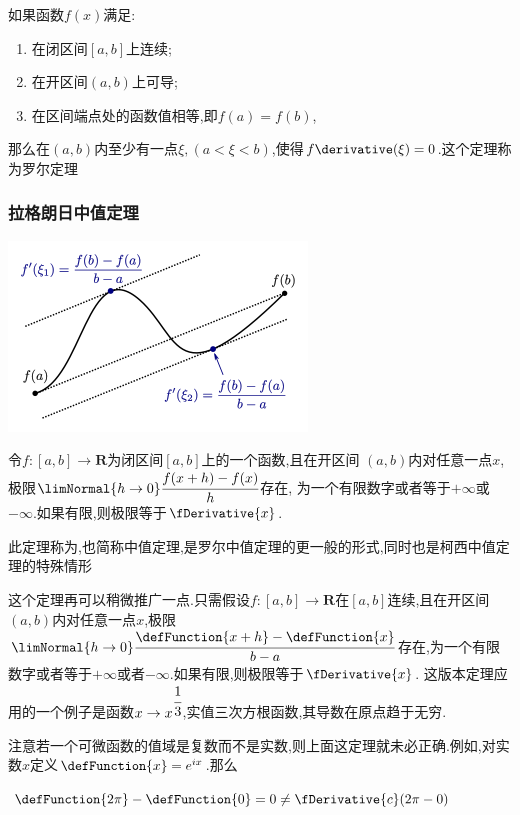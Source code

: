 {{{{  如果函数$f(x)$满足:

  \begin{enumerate}
    \item 在闭区间$[a,b]$上连续;
    \item 在开区间$(a,b)$上可导;
    \item 在区间端点处的函数值相等,即$f(a) = f(b)$,
  \end{enumerate}

  那么在$(a,b)$内至少有一点$\xi, (a<\xi<b)$,使得$f\derivative(\xi) = 0$.这个定理称为罗尔定理
}%

\subsubsection{拉格朗日中值定理}{
\begin{center}
  \includegraphics{resources/Lagrange's_mean_value_theorem.png}
\end{center}

令$f : [a,b] \to \mathbf{R}$为闭区间$[a,b]$上的一个函数,且在开区间
$(a,b)$内对任意一点$x$,极限$\limNormal{h \to 0}\cfrac{f(x + h) - f(x)}{h}$存在,
为一个有限数字或者等于$+\infty$或$-\infty$.如果有限,则极限等于$\fDerivative{x}$.

此定理称为{},也简称中值定理,是罗尔中值定理的更一般的形式,同时也是柯西中值定理的特殊情形

这个定理再可以稍微推广一点.只需假设$f : [a,b] \to \mathbf{R}$在$[a,b]$连续,且在开区间$(a,b)$内对任意一点$x$,极限$\limNormal{h \to 0}
  \cfrac{\defFunction{x + h} - \defFunction{x}}{b - a}$存在,为一个有限数字或者等于$+\infty$或者$-\infty$.如果有限,则极限等于$\fDerivative{x}$.
这版本定理应用的一个例子是函数$x \to x^{\cfrac{1}{3}}$,实值三次方根函数,其导数在原点趋于无穷.

注意若一个可微函数的值域是复数而不是实数,则上面这定理就未必正确.例如,对实数$x$定义$\defFunction{x} = e^{ix}$.那么

$\defFunction{2\pi} - \defFunction{0} = 0 \neq \fDerivative{c}(2\pi - 0)$

}}}}
